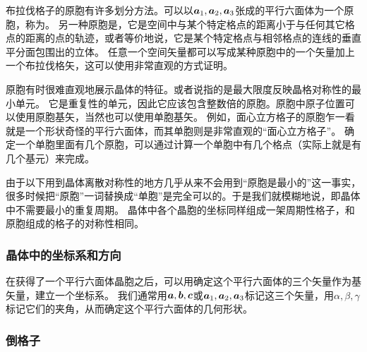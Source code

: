 布拉伐格子的原胞有许多划分方法。可以以$\vb*{a}_1, \vb*{a}_2, \vb*{a}_3$张成的平行六面体为一个原胞，称为。
另一种原胞是，它是空间中与某个特定格点的距离小于与任何其它格点的距离的点的轨迹，或者等价地说，它是某个特定格点与相邻格点的连线的垂直平分面包围出的立体。
任意一个空间矢量都可以写成某种原胞中的一个矢量加上一个布拉伐格矢，这可以使用非常直观的方式证明。

原胞有时很难直观地展示晶体的特征。或者说指的是最大限度反映晶格对称性的最小单元。
它是重复性的单元，因此它应该包含整数倍的原胞。原胞中原子位置可以使用原胞基矢，当然也可以使用单胞基矢。
例如，面心立方格子的原胞乍一看就是一个形状奇怪的平行六面体，而其单胞则是非常直观的“面心立方格子”。
确定一个单胞里面有几个原胞，可以通过计算一个单胞中有几个格点（实际上就是有几个基元）来完成。

由于以下用到晶体离散对称性的地方几乎从来不会用到“原胞是最小的”这一事实，很多时候把“原胞”一词替换成“单胞”是完全可以的。于是我们就模糊地说，即晶体中不需要最小的重复周期。
晶体中各个晶胞的坐标同样组成一架周期性格子，和原胞组成的格子的对称性相同。

\subsubsection{晶体中的坐标系和方向}


在获得了一个平行六面体晶胞之后，可以用确定这个平行六面体的三个矢量作为基矢量，建立一个坐标系。
我们通常用$\vb*{a}, \vb*{b}, \vb*{c}$或$\vb*{a}_1, \vb*{a}_2, \vb*{a}_3$标记这三个矢量，用$\alpha, \beta, \gamma$标记它们的夹角，从而确定这个平行六面体的几何形状。

\subsubsection{倒格子}

